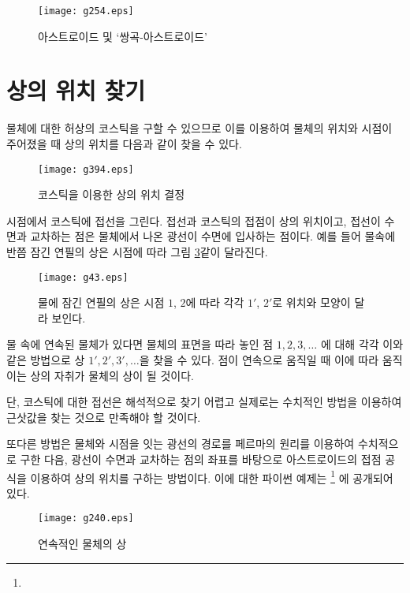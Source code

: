 \documentclass[twocolumn]{article}
\begin{document}
\begin{figure}
	\centering
	\texttt{[image: g254.eps]}
	\caption{아스트로이드 및 `쌍곡-아스트로이드'}
	\label{fig:hyperastroid}
\end{figure}

\section{상의 위치 찾기}
물체에 대한 허상의 코스틱을 구할 수 있으므로 이를 이용하여 물체의 위치와 
시점이 주어졌을 때 상의 위치를 다음과 같이 찾을 수 있다.

\begin{figure}[ht]
	\centering
	\texttt{[image: g394.eps]}
	\caption{코스틱을 이용한 상의 위치 결정}
	\label{fig:image_caustic}
\end{figure}

시점에서 코스틱에 접선을 그린다. 접선과 코스틱의 접점이 상의 위치이고, 접선이 수면과 
교차하는 점은 물체에서 나온 광선이 수면에 입사하는 점이다. 
예를 들어 물속에 반쯤 잠긴 연필의 상은 시점에 따라 그림 \ref{fig:pencil_view}\과 같이 달라진다.
\begin{figure}[ht]
	\centering
	\texttt{[image: g43.eps]}
	\caption{물에 잠긴 연필의 상은 시점 $1$, $2$에 따라 각각 $1'$, $2'$로 위치와 모양이 달라 보인다.}
	\label{fig:pencil_view}
\end{figure}

물 속에 연속된 물체가 있다면 물체의 표면을 따라 놓인 점 $1, 2, 3, \dots$ 에 대해 
각각 이와 같은 방법으로 상 $1', 2', 3', \dots$을 찾을 수 있다. 점이 연속으로 움직일 때 이에 따라 움직이는 상의 자취가 
물체의 상이 될 것이다.

단, 코스틱에 대한 접선은 해석적으로 찾기 어렵고 실제로는 수치적인 방법을 이용하여 
근삿값을 찾는 것으로 만족해야 할 것이다.

또다른 방법은 물체와 시점을 잇는 광선의 경로를 페르마의 원리를 이용하여 수치적으로 
구한 다음, 광선이 수면과 교차하는 점의 좌표를 바탕으로 아스트로이드의 접점 공식을 이용하여
상의 위치를 구하는 방법이다. 이에 대한 파이썬 예제는  
\href{https://github.com/mingshey/python_projects/blob/main/Refraction_Image.ipynb}%
{}\footnote{} 에 공개되어 있다.

\begin{figure}[ht]
	\centering
	\texttt{[image: g240.eps]}
	\caption{연속적인 물체의 상}
	\label{fig:extended_image}
\end{figure}
\end{document}
